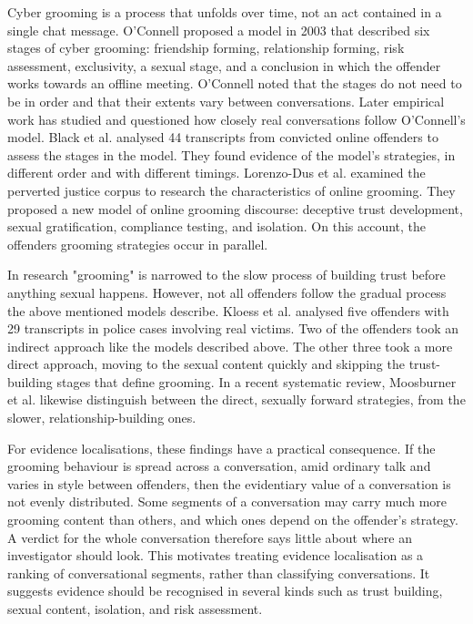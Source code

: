 Cyber grooming is a process that unfolds over time, not an act contained in a single chat message. O'Connell \cite{oconnell2003} proposed a model in 2003 that described six stages of cyber grooming: friendship forming, relationship forming, risk assessment, exclusivity, a sexual stage, and a conclusion in which the offender works towards an offline meeting. O'Connell noted that the stages do not need to be in order and that their extents vary between conversations.
Later empirical work has studied and questioned how closely real conversations follow O'Connell's model. Black et al. \cite{black2015} analysed 44 transcripts from convicted online offenders to assess the stages in the model. They found evidence of the model's strategies, in different order and with different timings. Lorenzo-Dus et al. \cite{lorenzodus2016} examined the perverted justice \cite{pervertedjustice} corpus to research the characteristics of online grooming. They proposed a new model of online grooming discourse: deceptive trust development, sexual gratification, compliance testing, and isolation. On this account, the offenders grooming strategies occur in parallel.

In research "grooming" is narrowed to the slow process of building trust before anything sexual happens. However, not all offenders follow the gradual process the above mentioned models describe. Kloess et al. \cite{kloess2019} analysed five offenders with 29 transcripts in police cases involving real victims. Two of the offenders took an indirect approach like the models described above. The other three took a more direct approach, moving to the sexual content quickly and skipping the trust-building stages that define grooming. In a recent systematic review, Moosburner et al. \cite{moosburner2026} likewise distinguish between the direct, sexually forward strategies, from the slower, relationship-building ones. 

For evidence localisations, these findings have a practical consequence. If the grooming behaviour is spread across a conversation, amid ordinary talk and varies in style between offenders, then the evidentiary value of a conversation is not evenly distributed. Some segments of a conversation may carry much more grooming content than others, and which ones depend on the offender's strategy. A verdict for the whole conversation therefore says little about where an investigator should look. This motivates treating evidence localisation as a ranking of conversational segments, rather than classifying conversations. It suggests evidence should be recognised in several kinds such as trust building, sexual content, isolation, and risk assessment. 

